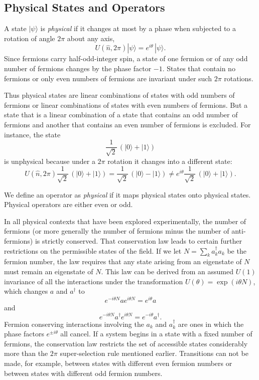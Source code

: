 \documentclass[12pt]{article}
\def\beq{\begin{equation}}
\def\eeq{\end{equation}}
\def\ad{a^\dgr}
\def\th{\theta}
\def\dgr{\dagger}
\begin{document}
\subsection{Physical States and Operators}
A state $ | \psi \rangle $ is \emph{physical\/}
if it changes at most by a phase
when subjected to a rotation of angle $ 2 \pi $
about any axis,
\beq
U( \hat n , 2 \pi ) | \psi \rangle = e^{ i \theta } 
\, | \psi \rangle .
\label {physst}
\eeq
Since fermions carry half-odd-integer spin,
a state of one fermion or of any odd number
of fermions changes by the phase factor $ -1 $.  
States that contain no fermions or only even
numbers of fermions are invariant under such
$ 2 \pi $ rotations.
\par
Thus physical states are linear combinations
of states with odd numbers of fermions
or linear combinations of states with even
numbers of fermions.  But a state that is
a linear combination of a state that contains
an odd number of fermions and another that 
contains an even number of fermions is excluded.  
For instance, the state 
\beq
\frac { 1 } { \sqrt{2} }
\, \left( | 0 \rangle + | 1 \rangle \right)
\label {sick}
\eeq
is unphysical because under a $ 2 \pi $ rotation
it changes into a different state:
\beq
U( \hat n , 2 \pi ) \frac { 1 } { \sqrt{2} }
\, \left( | 0 \rangle + | 1 \rangle \right)
= \frac { 1 } { \sqrt{2} } \,
\left( | 0 \rangle - | 1 \rangle \right)
\ne e^{ i \theta } \frac { 1 } { \sqrt{2} }
\, \left( | 0 \rangle + | 1 \rangle \right) .
\label {disease}
\eeq
\par
We define an operator as \emph{physical\/}
if it maps physical states onto physical states.
Physical operators are either even or odd. 
\par
In all physical contexts that have been explored experimentally, 
the number of fermions (or more generally the number 
of fermions minus the number of anti-fermions) is strictly conserved.
That conservation law leads to certain further 
restrictions on the permissible states of the field.
If we let $ N = \sum_k \ad_k a_k $ be the fermion number,
the law requires that any state arising from 
an eigenstate of $ N $ must remain an eigenstate of $ N $.
This law can be derived from an assumed $ U(1) $ invariance
of all the interactions under the transformation
$ U( \th ) = \exp \left( i \th N \right) $,
which changes $ a $ and $ \ad $ to
\beq
e ^ { - i \th N } a e ^ { i \th N } = e ^ { i \th } a 
\label {aq}
\eeq
and
\beq
e ^ { - i \th N } \ad e ^ { i \th N } = e ^ { - i \th } \ad .
\label {adq}
\eeq
Fermion conserving interactions involving the $ a_k $ 
and $ \ad_k $ are ones in which the phase factors
$ e ^ { \pm i \th } $ all cancel.
If a system begins in a state with a fixed number of fermions,
the conservation law restricts the set of accessible states
considerably more than the $ 2 \pi $ super-selection rule 
mentioned earlier.  
Transitions can not be made, for example,
between states with 
different even fermion numbers or between states with 
different odd fermion numbers.
\end{document}

